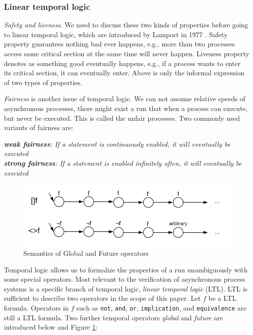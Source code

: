 \subsubsection{Linear temporal logic}
\textit{Safety and liveness}. We need to discuss these two kinds of properties before going to linear temporal logic, which are introduced by Lamport in 1977 \cite{Lamport:1977:PCM:1313313.1313439}. Safety property guarantees nothing bad ever happens, e.g., more than two processes access same critical section at the same time will never happen. Liveness property denotes as something good eventually happens, e.g., if a process wants to enter its critical section, it can eventually enter. Above is only the informal expression of two types of properties.

\textit{Fairness} is another issue of temporal logic. We can not assume relative speeds of asynchronous processes, there might exist a run that when a process can execute, but never be executed. This is called the unfair processes. Two commonly used variants of fairness are:

{\medbreak\indent\textit{\textbf{weak fairness}: If a statement is continuously enabled, it will eventually be executed}}
{\\\indent\textit{\textbf{strong fairness}: If a statement is enabled infinitely often, it will eventually be executed}}
\medbreak

\begin{figure}
\includegraphics[width=0.9\linewidth]{img/ltl}
\caption{Semantics of Global and Future operators}
\label{fig:ltl}
\end{figure}

Temporal logic allows us to formalize the properties of a run unambiguously with some special operators. Most relevant to the verification of asynchronous process systems is a specific branch of temporal logic, \textit{linear temporal logic} (LTL). LTL is sufficient to describe two operators in the scope of this paper. Let $f$ be a LTL formula. Operators in $f$ such as \texttt{not}, \texttt{and}, \texttt{or}, \texttt{implication}, and \texttt{equivalence} are still a LTL formula. Two further temporal operators \textit{global} and \textit{future} are introduced below and Figure \ref{fig:ltl}:

